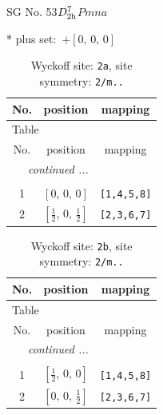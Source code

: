 \documentclass[fleqn,8pt]{jsarticle}
\begin{document}
\setcounter{MaxMatrixCols}{32}

\renewcommand{\tablename}{Table~}
\renewcommand{\figurename}{Figure~}
\begin{center}
\LARGE
SG No. 53\quad$D_{\rm 2h}^{7}$\quad$Pmna$\quad[ orthorhombic ]
\end{center}
* plus set:\,\,\,$+\left[ 0,\, 0,\, 0 \right]$
\renewcommand{\arraystretch}{1.2}
\begin{longtable}{ccc}
\caption{Wyckoff site: {\tt 2a}, site symmetry: {\tt 2/m..}}
 \\
 \hline \hline
No. & position & mapping \\ \hline \endfirsthead

\multicolumn{2}{l}{\tablename\ \thetable{}} \\
 \hline \hline
No. & position & mapping \\ \hline \endhead

 \hline \hline
\multicolumn{2}{r}{\footnotesize\it continued ...} \\ \endfoot

 \hline \hline
\multicolumn{2}{r}{} \\ \endlastfoot

1 & $\left[ 0,\, 0,\, 0 \right]$ & {\tt [1,4,5,8]} \\ \hline
2 & $\left[ \frac{1}{2},\, 0,\, \frac{1}{2} \right]$ & {\tt [2,3,6,7]} \\
\end{longtable}
\renewcommand{\arraystretch}{1.2}
\begin{longtable}{ccc}
\caption{Wyckoff site: {\tt 2b}, site symmetry: {\tt 2/m..}}
 \\
 \hline \hline
No. & position & mapping \\ \hline \endfirsthead

\multicolumn{2}{l}{\tablename\ \thetable{}} \\
 \hline \hline
No. & position & mapping \\ \hline \endhead

 \hline \hline
\multicolumn{2}{r}{\footnotesize\it continued ...} \\ \endfoot

 \hline \hline
\multicolumn{2}{r}{} \\ \endlastfoot

1 & $\left[ \frac{1}{2},\, 0,\, 0 \right]$ & {\tt [1,4,5,8]} \\ \hline
2 & $\left[ 0,\, 0,\, \frac{1}{2} \right]$ & {\tt [2,3,6,7]} \\
\end{longtable}
\end{document}
